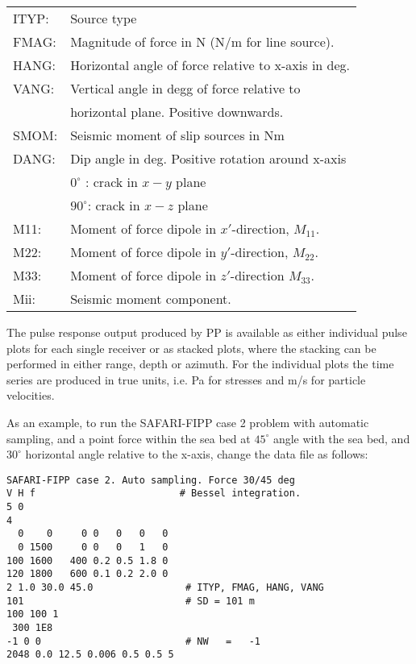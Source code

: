 \begin{tabular}{ll}
    ITYP:  &     Source type \\
    FMAG:  &    Magnitude of force in N (N/m for line source). \\
    HANG:  &  Horizontal angle of force relative to x-axis in deg. \\ 
    VANG:  &  Vertical  angle in degg of force relative to \\ 
           &  horizontal  plane. Positive downwards. \\
    SMOM:  &  Seismic moment of slip sources in Nm \\
    DANG:  &  Dip angle in deg. Positive rotation around x-axis \\
           &  $0^{\circ}$ : crack in $x-y$ plane \\
           &  $90^{\circ}$: crack in $x-z$ plane \\
    M11:  &  Moment of force dipole in $x'$-direction, $M_{11}$. \\
    M22:  &  Moment of force dipole in $y'$-direction, $M_{22}$. \\
    M33:  &  Moment of force dipole in $z'$-direction  $M_{33}$. \\
    Mii:  &  Seismic moment component.
\end{tabular}


    The pulse response output produced by PP  
is  available  as either individual pulse plots for  each  single 
receiver or as stacked plots, where the stacking can be performed 
in either range, depth or  azimuth.  For 
the individual plots the time series are produced in true  units, 
i.e. Pa for stresses and m/s for particle velocities.

As an example, to run the SAFARI-FIPP case 2 problem with automatic
sampling, and a point force within the sea bed 
at $45^{\circ}$ angle with the sea bed,
and $30^{\circ}$ horizontal angle relative to the x-axis, 
change the data file as  follows:

\small
\begin{verbatim}
SAFARI-FIPP case 2. Auto sampling. Force 30/45 deg
V H f                         # Bessel integration.
5 0
4
  0    0     0 0   0   0   0
  0 1500     0 0   0   1   0
100 1600   400 0.2 0.5 1.8 0
120 1800   600 0.1 0.2 2.0 0
2 1.0 30.0 45.0                # ITYP, FMAG, HANG, VANG  
101                            # SD = 101 m
100 100 1 
 300 1E8                      
-1 0 0                         # NW   =   -1
2048 0.0 12.5 0.006 0.5 0.5 5
\end{verbatim}
\normalsize 

